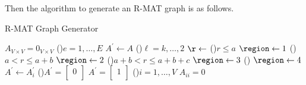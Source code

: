 Then the algorithm to generate an R-MAT graph is as follows.
\par
\begin{algorithm}[H]\label{algo:R-MAT-graph-generator-algo}
	\DontPrintSemicolon
	\caption{R-MAT Graph Generator}
	\BlankLine

	\(A_{V\times V} = 0_{V \times V}\) 
	\;
	\For(){\(e= 1, \ldots , E\)}{
		\(A^\prime \gets A\)\;
		\For(){\(\ell = k, \ldots , 2\)}{
			\(\r\gets \)\rand{\([0, 1]\)} \;
			\uIf(){\(r\leq a\) }{
				\(\region\gets 1\)\;
			}\uElseIf(){\(a < r \leq  a + b\)}{
				\(\region\gets 2\)\;
			}\uElseIf(){\(a + b < r \leq  a + b + c\)}{
				\(\region\gets 3\)\;
			}\Else(){
				\(\region\gets 4\)\;
			}
			\(A^\prime \gets A^\prime_i\)
		}
		\If(){\(A^\prime = \begin{bmatrix}0 \\\end{bmatrix}\)}{
			\(A^\prime = \begin{bmatrix}1 \\ \end{bmatrix}\)
		}
	}
	\;
	\For(){\(i = 1, \ldots, V\)}{
		\(A_{ii} = 0\)\label{algo:R-MAT-graph-generator-algo-clean-up}
	}
	\;
\end{algorithm}

